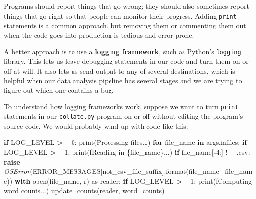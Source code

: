 \documentclass[
]{krantz}
\makeatletter
\newenvironment{Shaded}{\begin{snugshade}}{\end{snugshade}}
\newcommand{\BuiltInTok}[1]{#1}
\newcommand{\ControlFlowTok}[1]{\textcolor[rgb]{0.13,0.29,0.53}{\textbf{#1}}}
\newcommand{\DecValTok}[1]{\textcolor[rgb]{0.00,0.00,0.81}{#1}}
\newcommand{\ImportTok}[1]{#1}
\newcommand{\KeywordTok}[1]{\textcolor[rgb]{0.13,0.29,0.53}{\textbf{#1}}}
\newcommand{\NormalTok}[1]{#1}
\newcommand{\OperatorTok}[1]{\textcolor[rgb]{0.81,0.36,0.00}{\textbf{#1}}}
\newcommand{\PreprocessorTok}[1]{\textcolor[rgb]{0.56,0.35,0.01}{\textit{#1}}}
\newcommand{\SpecialCharTok}[1]{\textcolor[rgb]{0.00,0.00,0.00}{#1}}
\newcommand{\SpecialStringTok}[1]{\textcolor[rgb]{0.31,0.60,0.02}{#1}}
\newcommand{\StringTok}[1]{\textcolor[rgb]{0.31,0.60,0.02}{#1}}
\newenvironment{kframe}{%
\medskip{}
\setlength{\fboxsep}{.8em}
 \def\at@end@of@kframe{}%
 \ifinner\ifhmode%
  \def\at@end@of@kframe{\end{minipage}}%
  \begin{minipage}{\columnwidth}%
 \fi\fi%
 \def\FrameCommand##1{\hskip\@totalleftmargin \hskip-\fboxsep
 \colorbox{shadecolor}{##1}\hskip-\fboxsep
     \hskip-\linewidth \hskip-\@totalleftmargin \hskip\columnwidth}%
 \MakeFramed {\advance\hsize-\width
   \@totalleftmargin\z@ \linewidth\hsize
   \@setminipage}}%
 {\par\unskip\endMakeFramed%
 \at@end@of@kframe}
\renewenvironment{Shaded}{\begin{kframe}}{\end{kframe}}
\newcommand{\gref}[2]{\hyperlink{#2}{\textbf{#1}}}
\makeatother
\begin{document}
Programs should report things that go wrong;
they should also sometimes report things that go right
so that people can monitor their progress.
Adding \texttt{print} statements is a common approach,
but removing them or commenting them out when the code goes into production is tedious and error-prone.

A better approach is to use a \gref{logging framework}{logging\_framework},
such as Python's \texttt{logging} library.
This lets us leave debugging statements in our code
and turn them on or off at will.
It also lets us send output to any of several destinations,
which is helpful when our data analysis pipeline has several stages
and we are trying to figure out which one contains a bug.

To understand how logging frameworks work,
suppose we want to turn \texttt{print} statements in our \texttt{collate.py} program on or off
without editing the program's source code.
We would probably wind up with code like this:

\begin{Shaded}
\begin{Highlighting}[]
\ControlFlowTok{if}\NormalTok{ LOG\_LEVEL }\OperatorTok{\textgreater{}=} \DecValTok{0}\NormalTok{:}
    \BuiltInTok{print}\NormalTok{(}\StringTok{\textquotesingle{}Processing files...\textquotesingle{}}\NormalTok{)}
\ControlFlowTok{for}\NormalTok{ file\_name }\KeywordTok{in}\NormalTok{ args.infiles:}
    \ControlFlowTok{if}\NormalTok{ LOG\_LEVEL }\OperatorTok{\textgreater{}=} \DecValTok{1}\NormalTok{:}
        \BuiltInTok{print}\NormalTok{(}\SpecialStringTok{f\textquotesingle{}Reading in }\SpecialCharTok{\{}\NormalTok{file\_name}\SpecialCharTok{\}}\SpecialStringTok{...\textquotesingle{}}\NormalTok{)}
    \ControlFlowTok{if}\NormalTok{ file\_name[}\OperatorTok{{-}}\DecValTok{4}\NormalTok{:] }\OperatorTok{!=} \StringTok{\textquotesingle{}.csv\textquotesingle{}}\NormalTok{:}
        \ControlFlowTok{raise} \PreprocessorTok{OSError}\NormalTok{(ERROR\_MESSAGES[}\StringTok{\textquotesingle{}not\_csv\_file\_suffix\textquotesingle{}}\NormalTok{].}\BuiltInTok{format}\NormalTok{(file\_name}\OperatorTok{=}\NormalTok{file\_name))}
    \ControlFlowTok{with} \BuiltInTok{open}\NormalTok{(file\_name, }\StringTok{\textquotesingle{}r\textquotesingle{}}\NormalTok{) }\ImportTok{as}\NormalTok{ reader:}
        \ControlFlowTok{if}\NormalTok{ LOG\_LEVEL }\OperatorTok{\textgreater{}=} \DecValTok{1}\NormalTok{:}
            \BuiltInTok{print}\NormalTok{(}\SpecialStringTok{f\textquotesingle{}Computing word counts...\textquotesingle{}}\NormalTok{)}
\NormalTok{        update\_counts(reader, word\_counts)}
\end{Highlighting}
\end{Shaded}
\end{document}
